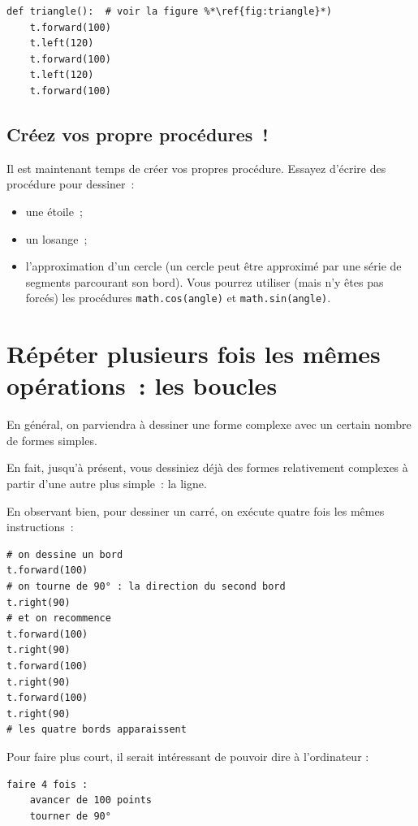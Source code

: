 \documentclass[11pt,a4paper]{article}
\begin{document}
\begin{lstlisting}[float]
def triangle():  # voir la figure %*\ref{fig:triangle}*)
    t.forward(100)
    t.left(120)
    t.forward(100)
    t.left(120)
    t.forward(100)
\end{lstlisting}

\subsection{Créez vos propre procédures~!}

Il est maintenant temps de créer vos propres procédure. Essayez d'écrire des
procédure pour dessiner~:

\begin{itemize}
    \item une étoile~;
    \item un losange~;
    \item l'approximation d'un cercle (un cercle peut être approximé par une
        série de segments parcourant son bord). Vous pourrez utiliser (mais n'y
        êtes pas forcés) les procédures \lstinline{math.cos(angle)} et
        \lstinline{math.sin(angle)}.
\end{itemize}

\section{Répéter plusieurs fois les mêmes opérations~: les boucles}

En général, on parviendra à dessiner une forme complexe avec un certain nombre
de formes simples.

En fait, jusqu'à présent, vous dessiniez déjà des formes relativement complexes
à partir d'une autre plus simple~: la ligne.

En observant bien, pour dessiner un carré, on exécute quatre fois les mêmes
instructions~:

\begin{lstlisting}
# on dessine un bord
t.forward(100)
# on tourne de 90° : la direction du second bord
t.right(90)
# et on recommence
t.forward(100)
t.right(90)
t.forward(100)
t.right(90)
t.forward(100)
t.right(90)
# les quatre bords apparaissent
\end{lstlisting}

Pour faire plus court, il serait intéressant de pouvoir dire à
l'ordinateur :

\begin{lstlisting}
faire 4 fois :
    avancer de 100 points
    tourner de 90°
\end{lstlisting}
\end{document}
